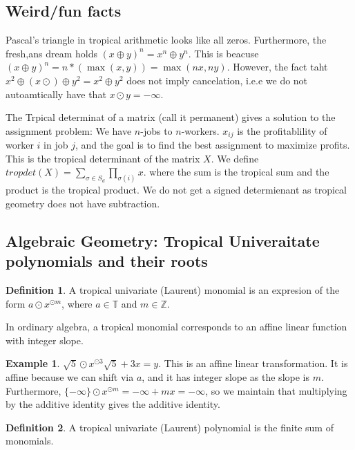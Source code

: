 \documentclass[11pt]{article}
\theoremstyle{definition}
\newtheorem{protoexample}{Example}[section]
\newenvironment{ex}
   {\begin{protoexample}}
   {\end{protoexample}}
\newtheorem{protodefinition}{Definition}[section]
\newenvironment{define}
   {\begin{protodefinition}}
   {\end{protodefinition}}
\def\ZZ{{\mathbb Z}}
\def\TT{{\mathbb T}}
\begin{document}
\subsection{Weird/fun facts}


Pascal's triangle in tropical arithmetic looks like all zeros. Furthermore, the fresh,ans dream holds $(x\oplus y)^n = x^n \oplus y^n$. This is beacuse $(x \oplus y)^n = n *(\max(x,y)) = \max(nx,ny)$. However, the fact taht $x^2 \oplus (x \odot ) \oplus y^2 = x^2 \oplus y^2$ does not imply cancelation, i.e.e we do not autoamtically have that $x \odot y = -\infty$.


The Trpical determinat of a matrix (call it permanent) gives a solution to the assignment problem: We have $n$-jobs to $n$-workers. $x_{ij}$ is the profitablility of worker $i$ in job $j$, and the goal is to find the best assignment to maximize profits. This is the tropical determinant of the matrix $X$. We define $tropdet(X) = \sum_{\sigma \in S_d}  \prod_{\sigma(i)}x$. where the sum is the tropical sum and the product is the tropical product. We do not get a signed determienant as tropical geometry does not have subtraction.




\subsection{Algebraic Geometry: Tropical Univeraitate polynomials and their roots}

\begin{define}
    A tropical univariate (Laurent) monomial is an expresion of the form $a \odot x^{\odot m}$, where $a \in \TT$ and $m \in \ZZ$.
\end{define}

In ordinary algebra, a tropical monomial corresponds to an affine linear function with integer slope.

\begin{ex}
    $\sqrt{5}\odot x^{\odot 3} \sqrt{5} + 3x = y$. This is an affine linear transformation. It is affine because we can shift via $a$, and it has integer slope as the slope is $m$. Furthermore, $\{-\infty\}\odot x^{\odot m} = -\infty + mx = - \infty$, so we maintain that multiplying by the additive identity gives the additive identity.
\end{ex}


\begin{define}
    A tropical univariate (Laurent) polynomial is the finite sum of monomials.
\end{define}
\end{document}
